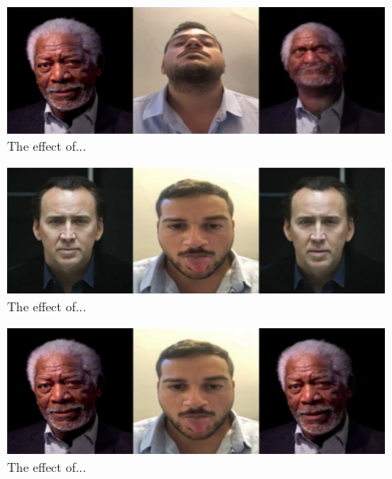 \documentclass[english,12pt]{article}
\begin{document}
\begin{figure}[htb]
  \begin{centering}
      \includegraphics[scale=0.29]{images/‏‏Amit_tilt_freeman.PNG}
  \par\end{centering}
  \caption{\label{fig:Amit_tilt_freeman}The effect of...}
\end{figure}

\begin{figure}[htb]
  \begin{centering}
      \includegraphics[scale=0.29]{images/‏‏Amit_tongue_cage.PNG}
  \par\end{centering}
  \caption{\label{fig:Amit_tongue_cage}The effect of...}
\end{figure}

\begin{figure}[htb]
  \begin{centering}
      \includegraphics[scale=0.29]{images/‏‏Amit_tongue_freeman.PNG}
  \par\end{centering}
  \caption{\label{fig:Amit_tongue_freeman}The effect of...}
\end{figure}
\end{document}
